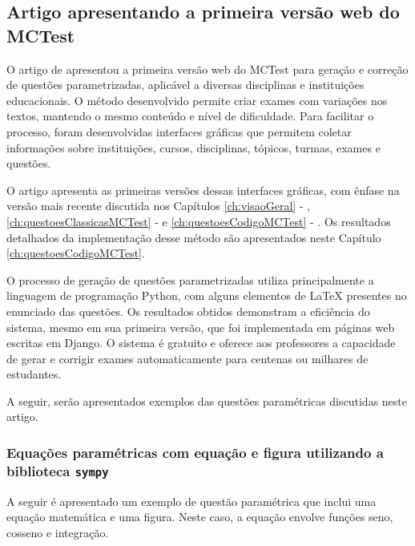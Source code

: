 \subsection{Artigo apresentando a primeira versão web do MCTest}\label{sec:MTest-5_web}

O artigo de  apresentou a primeira versão web do MCTest para geração e correção de questões parametrizadas, aplicável a diversas disciplinas e instituições educacionais. O método desenvolvido permite criar exames com variações nos textos, mantendo o mesmo conteúdo e nível de dificuldade. Para facilitar o processo, foram desenvolvidas interfaces gráficas que permitem coletar informações sobre instituições, cursos, disciplinas, tópicos, turmas, exames e questões.

O artigo apresenta as primeiras versões dessas interfaces gráficas, com ênfase na versão mais recente discutida nos Capítulos \ref{ch:visaoGeral} - , \ref{ch:questoesClassicasMCTest} -  e \ref{ch:questoesCodigoMCTest} - . Os resultados detalhados da implementação desse método são apresentados neste Capítulo \ref{ch:questoesCodigoMCTest}.

O processo de geração de questões parametrizadas utiliza principalmente a linguagem de programação Python, com alguns elementos de \LaTeX{} presentes no enunciado das questões. Os resultados obtidos demonstram a eficiência do sistema, mesmo em sua primeira versão, que foi implementada em páginas web escritas em Django. O sistema é gratuito e oferece aos professores a capacidade de gerar e corrigir exames automaticamente para centenas ou milhares de estudantes.

A seguir, serão apresentados exemplos das questões paramétricas discutidas neste artigo.

\subsubsection{Equações paramétricas com equação e figura utilizando a biblioteca \texttt{sympy}}\label{sec:equacao_sympy_figura}

A seguir é apresentado um exemplo de questão paramétrica que inclui uma equação matemática e uma figura. Neste caso, a equação envolve funções seno, cosseno e integração.

